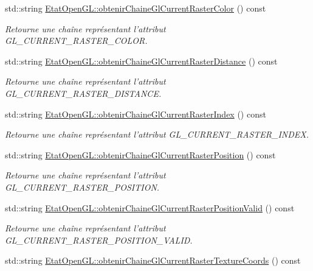 \begin{DoxyCompactItemize}
std\-::string \hyperlink{group__utilitaire_ga62ef22c97a3ecc8c7e956f2fd7267b9d}{Etat\-Open\-G\-L\-::obtenir\-Chaine\-Gl\-Current\-Raster\-Color} () const 
\begin{DoxyCompactList}\small\item\em Retourne une chaîne représentant l'attribut G\-L\-\_\-\-C\-U\-R\-R\-E\-N\-T\-\_\-\-R\-A\-S\-T\-E\-R\-\_\-\-C\-O\-L\-O\-R. \end{DoxyCompactList}\item 
std\-::string \hyperlink{group__utilitaire_ga130c72bf45a65d7d7770c77c7f71cf5c}{Etat\-Open\-G\-L\-::obtenir\-Chaine\-Gl\-Current\-Raster\-Distance} () const 
\begin{DoxyCompactList}\small\item\em Retourne une chaîne représentant l'attribut G\-L\-\_\-\-C\-U\-R\-R\-E\-N\-T\-\_\-\-R\-A\-S\-T\-E\-R\-\_\-\-D\-I\-S\-T\-A\-N\-C\-E. \end{DoxyCompactList}\item 
std\-::string \hyperlink{group__utilitaire_ga9d14728a6f086186ff9ec92738952892}{Etat\-Open\-G\-L\-::obtenir\-Chaine\-Gl\-Current\-Raster\-Index} () const 
\begin{DoxyCompactList}\small\item\em Retourne une chaîne représentant l'attribut G\-L\-\_\-\-C\-U\-R\-R\-E\-N\-T\-\_\-\-R\-A\-S\-T\-E\-R\-\_\-\-I\-N\-D\-E\-X. \end{DoxyCompactList}\item 
std\-::string \hyperlink{group__utilitaire_ga1151f4eee3a50e14e0157b18b6fefaa4}{Etat\-Open\-G\-L\-::obtenir\-Chaine\-Gl\-Current\-Raster\-Position} () const 
\begin{DoxyCompactList}\small\item\em Retourne une chaîne représentant l'attribut G\-L\-\_\-\-C\-U\-R\-R\-E\-N\-T\-\_\-\-R\-A\-S\-T\-E\-R\-\_\-\-P\-O\-S\-I\-T\-I\-O\-N. \end{DoxyCompactList}\item 
std\-::string \hyperlink{group__utilitaire_gaa95c762062531085430d3bd8381c1ab1}{Etat\-Open\-G\-L\-::obtenir\-Chaine\-Gl\-Current\-Raster\-Position\-Valid} () const 
\begin{DoxyCompactList}\small\item\em Retourne une chaîne représentant l'attribut G\-L\-\_\-\-C\-U\-R\-R\-E\-N\-T\-\_\-\-R\-A\-S\-T\-E\-R\-\_\-\-P\-O\-S\-I\-T\-I\-O\-N\-\_\-\-V\-A\-L\-I\-D. \end{DoxyCompactList}\item 
std\-::string \hyperlink{group__utilitaire_gae1b30e504db9237dce13eade239c8c5a}{Etat\-Open\-G\-L\-::obtenir\-Chaine\-Gl\-Current\-Raster\-Texture\-Coords} () const 

\end{DoxyCompactItemize}
